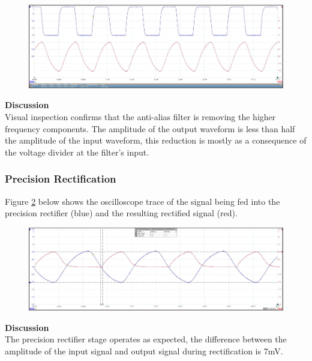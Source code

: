 \begin{figure}[H]
	\centering
	\includegraphics[width=\textwidth]{figures/results/low_pass_filter/36kHzsquarewavein.JPG}
	\label{fig:anti_alias_filtering}
\end{figure}

\textbf{Discussion}\\
Visual inspection confirms that the anti-alias filter is removing the higher frequency components. The amplitude of the output waveform is less than half the amplitude of the input waveform, this reduction is mostly as a consequence of the voltage divider at the filter's input.

\subsubsection{Precision Rectification}

Figure \ref{fig:precision_rectification} below shows the oscilloscope trace of the signal being fed into the precision rectifier (blue) and the resulting rectified signal (red).

\begin{figure}[H]
	\centering
	\includegraphics[width=\textwidth]{figures/results/rectification/36kHz.JPG}
	\label{fig:precision_rectification}
\end{figure}

\textbf{Discussion}\\
The precision rectifier stage operates as expected, the difference between the amplitude of the input signal and output signal during rectification is 7mV.

